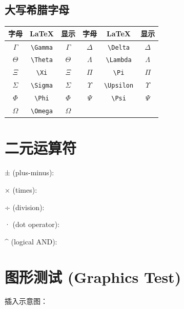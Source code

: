 \documentclass[a4paper,12pt]{article}
\begin{document}
    \subsection*{大写希腊字母}
    \begin{tabular}{c c c c c c}
        \hline
        字母       & LaTeX         & 显示       & 字母         & LaTeX           & 显示         \\
        \hline
        $\Gamma$ & \verb|\Gamma| & $\Gamma$ & $\Delta$   & \verb|\Delta|   & $\Delta$   \\
        $\Theta$ & \verb|\Theta| & $\Theta$ & $\Lambda$  & \verb|\Lambda|  & $\Lambda$  \\
        $\Xi$    & \verb|\Xi|    & $\Xi$    & $\Pi$      & \verb|\Pi|      & $\Pi$      \\
        $\Sigma$ & \verb|\Sigma| & $\Sigma$ & $\Upsilon$ & \verb|\Upsilon| & $\Upsilon$ \\
        $\Phi$   & \verb|\Phi|   & $\Phi$   & $\Psi$     & \verb|\Psi|     & $\Psi$     \\
        $\Omega$ & \verb|\Omega| & $\Omega$ &            &                 &            \\
        \hline
    \end{tabular}


    \section*{二元运算符}
    ± (plus-minus):\pm

    × (times):\times

    ÷ (division):\div

    · (dot operator):\dot

    ^ (logical AND):\wedge


    \section*{图形测试 (Graphics Test)}
    插入示意图：

\end{document}
